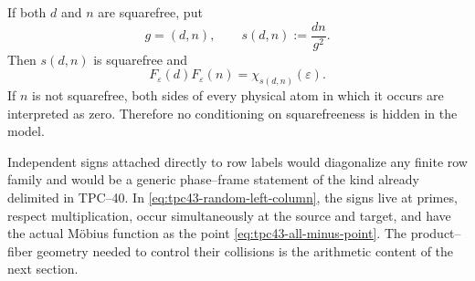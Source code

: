 If both \(d\) and \(n\) are squarefree, put
\begin{equation}
 g=(d,n),
 \qquad
 s(d,n):=\frac{dn}{g^2}.
 \label{eq:tpc43-squarefree-kernel}
\end{equation}
Then \(s(d,n)\) is squarefree and
\begin{equation}
 F_\varepsilon(d)F_\varepsilon(n)
 =\chi_{s(d,n)}(\varepsilon).
 \label{eq:tpc43-fused-Walsh-character}
\end{equation}
If \(n\) is not squarefree, both sides of every physical atom in which
it occurs are interpreted as zero.  Therefore no conditioning on
squarefreeness is hidden in the model.

\begin{remark}
\label{rem:tpc43-not-row-randomization}
Independent signs attached directly to row labels would diagonalize any
finite row family and would be a generic phase--frame statement of the
kind already delimited in TPC--40.  In
\eqref{eq:tpc43-random-left-column}, the signs live at primes, respect
multiplication, occur simultaneously at the source and target, and have
the actual M\"obius function as the point
\eqref{eq:tpc43-all-minus-point}.  The product--fiber geometry needed to
control their collisions is the arithmetic content of the next section.
\end{remark}
